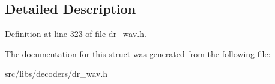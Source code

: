 \subsection{Detailed Description}


Definition at line 323 of file dr\-\_\-wav.\-h.



The documentation for this struct was generated from the following file\-:\begin{DoxyCompactItemize}
\item 
src/libs/decoders/dr\-\_\-wav.\-h\end{DoxyCompactItemize}
